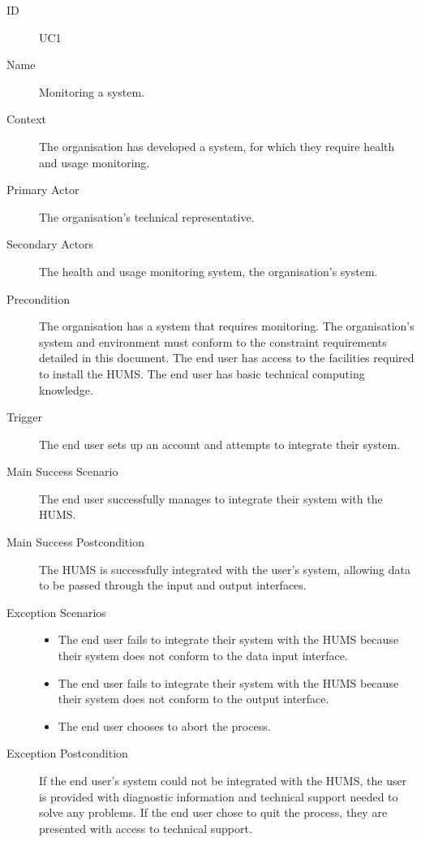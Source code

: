 \documentclass[10pt,a4paper]{article}
\begin{document}
\begin{description}
	\item[ID] UC1
	\item[Name] Monitoring a system.
	\item[Context] The organisation has developed a system, for which they
	               require health and usage monitoring.
	\item[Primary Actor] The organisation's technical representative.
	\item[Secondary Actors] The health and usage monitoring system, the
	                        organisation's system.
	\item[Precondition] The organisation has a system that requires monitoring.
	                    The organisation's system and environment must conform to
	                    the constraint requirements detailed in this document. The
	                    end user has access to the facilities required to install
	                    the HUMS. The end user has basic technical computing
	                    knowledge.
	\item[Trigger] The end user sets up an account and attempts to integrate
	               their system.
	\item[Main Success Scenario] The end user successfully manages to integrate
			their system with the HUMS.
	\item[Main Success Postcondition] The HUMS is successfully integrated with
			the user's system, allowing data to be passed through the input and output
			interfaces.
	\item[Exception Scenarios]
			\begin{itemize}
				\item The end user fails to integrate their system with the HUMS because
				      their system does not conform to the data input interface.
				\item The end user fails to integrate their system with the HUMS because
				      their system does not conform to the output interface.
				\item The end user chooses to abort the process.
			\end{itemize}
	\item[Exception Postcondition]
			If the end user's system could not be integrated with the HUMS, the user
			is provided with diagnostic information and technical support needed to
			solve any problems. If the end user chose to quit the process, they are
			presented with access to technical support.
\end{description}
\end{document}
